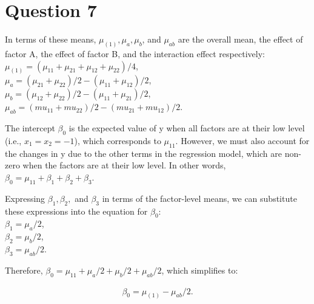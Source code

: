\documentclass{article}
\begin{document}
\section*{Question 7}
\begin{flushleft}
In terms of these means, $\mu_{(1)}, \mu_a, \mu_b$, and $\mu_{ab}$ are the overall mean,
the effect of factor A, the effect of factor B, and the interaction effect respectively:\\

$\mu_{(1)} = (\mu_{11} + \mu_{21} + \mu_{12} + \mu_{22}) / 4$,\\
$\mu_a = (\mu_{21} + \mu_{22}) / 2 - (\mu_{11} + \mu_{12}) / 2$,\\
$\mu_b = (\mu_{12} + \mu_{22}) / 2 - (\mu_{11} + \mu_{21}) / 2$,\\
$\mu_{ab} = (mu_{11} + mu_{22}) / 2 - (mu_{21} + mu_{12}) / 2$.\\
\end{flushleft}
\begin{flushleft}
The intercept $\beta_0$ is the expected value of y when all factors are at their low level
(i.e., $x_1 = x_2 = -1$), which corresponds to $\mu_{11}$.
However, we must also account for the changes in y due to the other terms
in the regression model, which are non-zero when the factors are at their low level.
In other words, $\beta_0 = \mu_{11} + \beta_1 + \beta_2 + \beta_3$. \\
\end{flushleft}
\begin{flushleft}
Expressing $\beta_1, \beta_2,$ and $\beta_3$ in terms of the factor-level means, we can substitute these expressions into the equation for $\beta_0$:\\
$\beta_1 = \mu_a / 2$,\\
$\beta_2 = \mu_b / 2$,\\
$\beta_3 = \mu_{ab} / 2$.\\
\end{flushleft}
\begin{flushleft}
Therefore, $\beta_0 = \mu_{11} + \mu_a / 2 + \mu_b / 2 + \mu_{ab} / 2$, which simplifies to:
\end{flushleft}
\begin{align*}
    \beta_0 = \mu_{(1)} - \mu_{ab} / 2.
\end{align*}
\end{document}

